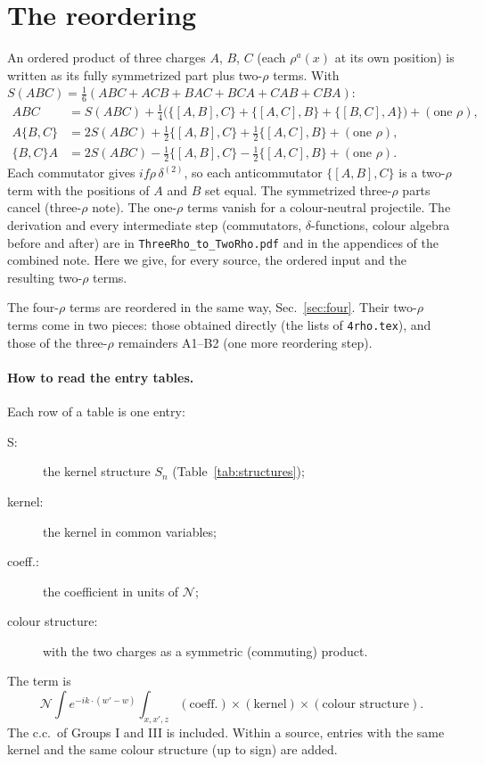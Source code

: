 \documentclass[10pt]{article}
\numberwithin{equation}{section}
\newcommand{\NN}{\mathcal N}
\begin{document}
\section{The reordering}\label{sec:reorder}
An ordered product of three charges $A$, $B$, $C$ (each $\rho^a(x)$ at its own position) is written as its fully symmetrized part plus two-$\rho$ terms. With $S(ABC)=\frac16(ABC+ACB+BAC+BCA+CAB+CBA)$:
\begin{align}
ABC&=S(ABC)+\tfrac14\Big(\big\{[A,B],C\big\}+\big\{[A,C],B\big\}+\big\{[B,C],A\big\}\Big)+(\text{one }\rho),\label{eq:plain}\\
A\{B,C\}&=2S(ABC)+\tfrac12\big\{[A,B],C\big\}+\tfrac12\big\{[A,C],B\big\}+(\text{one }\rho),\label{eq:Aanti}\\
\{B,C\}A&=2S(ABC)-\tfrac12\big\{[A,B],C\big\}-\tfrac12\big\{[A,C],B\big\}+(\text{one }\rho).\label{eq:antiA}
\end{align}
Each commutator gives $if\rho\,\delta^{(2)}$, so each anticommutator $\{[A,B],C\}$ is a two-$\rho$ term with the positions of $A$ and $B$ set equal. The symmetrized three-$\rho$ parts cancel (three-$\rho$ note). The one-$\rho$ terms vanish for a colour-neutral projectile. The derivation and every intermediate step (commutators, $\delta$-functions, colour algebra before and after) are in \texttt{ThreeRho\_to\_TwoRho.pdf} and in the appendices of the combined note. Here we give, for every source, the ordered input and the resulting two-$\rho$ terms.

The four-$\rho$ terms are reordered in the same way, Sec.~\ref{sec:four}. Their two-$\rho$ terms come in two pieces: those obtained directly (the lists of \texttt{4rho.tex}), and those of the three-$\rho$ remainders A1--B2 (one more reordering step).

\paragraph{How to read the entry tables.} Each row of a table is one entry:
\begin{description}
\item[S:] the kernel structure $S_n$ (Table~\ref{tab:structures});
\item[kernel:] the kernel in common variables;
\item[coeff.:] the coefficient in units of $\NN$;
\item[colour structure:] with the two charges as a symmetric (commuting) product.
\end{description}
The term is
\begin{equation}
\NN\int e^{-ik\cdot(w'-w)}\int_{x,x',z}(\text{coeff.})\times(\text{kernel})\times(\text{colour structure}).
\end{equation}
The c.c.\ of Groups I and III is included. Within a source, entries with the same kernel and the same colour structure (up to sign) are added.
\end{document}
